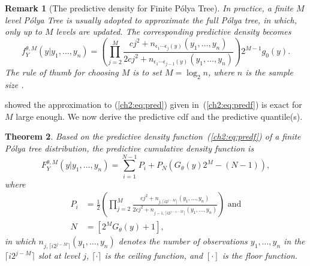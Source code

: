 \documentclass[12pt]{article}
\newtheorem{thm}{Theorem}[section]
\newtheorem{rmk}[thm]{Remark}
\newcommand{\polya}{P\'{o}lya}
\begin{document}
\begin{rmk}[The predictive density for Finite \polya{} Tree]
  In practice, a finite $M$ level \polya{} Tree is usually adopted to
  approximate the full \polya{} tree, in which, only up to $M$ levels
  are updated. The corresponding predictive density becomes
  \begin{equation}
    \label{ch2:eq:predf}
    f_Y^{\theta, M} (y|y_1, \ldots, y_n)  =  \left(
      \prod_{j=2}^M \frac{cj^2 + n_{\epsilon_1 \cdots \epsilon_j(y) }(y_1, \ldots, y_n)}{2cj^2
        + n_{\epsilon_1 \cdots \epsilon_{j-1}(y)}(y_1, \ldots, y_n)}
    \right)2^{M-1} g_0(y).
  \end{equation}
  The rule of thumb for choosing $M$ is to set $M=\log_2n$, where $n$
  is the sample size \citep{hanson2002}.
\end{rmk}

\citet{hanson2002} showed the approximation to (\ref{ch2:eq:pred}) given
in~(\ref{ch2:eq:predf}) is exact for $M$ large enough.  We now derive the
predictive cdf and the predictive quantile(s).

\begin{thm}
  Based on the predictive density function~(\ref{ch2:eq:predf}) of a
  finite \polya{} tree distribution, the predictive cumulative density
  function is
  \begin{equation}
    \label{ch2:eq:cdf}
    F^{\theta,M}_Y(y|y_1, \ldots, y_n) = \sum_{i=1}^{N-1} P_{i} + P_N
    \left( G_{\theta}(y)2^M -(N-1) \right),
  \end{equation}
  where
  \begin{align*}
    P_i &= \frac{1}{2} \left(\prod_{j=2}^M \frac{cj^2 + n_{j,\lceil
          i2^{j-M} \rceil}(y_1, \ldots, y_n)}{2cj^2 + n_{j-1,\lceil
          i2^{j-1-M} \rceil}(y_{1 },\ldots, y_n)} \right) \mbox{ and}\\
    N & = \left[ 2^{M } G_{\theta}(y) +1\right],
  \end{align*}
  in which $n_{j,\lceil i2^{j-M} \rceil}(y_1, \ldots, y_n)$ denotes
  the number of observations $y_1, \ldots, y_n$ in the $\lceil
  i2^{j-M} \rceil$ slot at level $j$, $\lceil \cdot \rceil$ is the
  ceiling function, and $[ \cdot ]$ is the floor function.
\end{thm}
\end{document}
